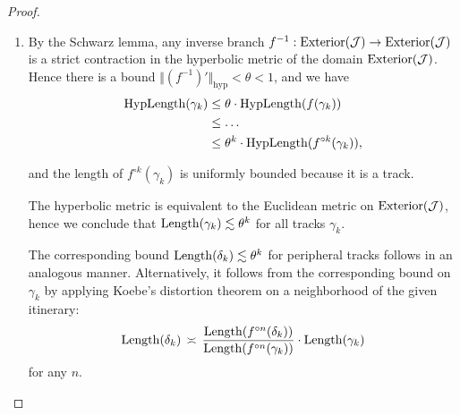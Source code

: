 \begin{proof} \leavevmode
\begin{enumerate}[label=\normalfont(\roman*)]
\item 
By the Schwarz lemma, any inverse branch $f^{-1}: \operatorname{Exterior}(\mathcal J) \to \operatorname{Exterior}(\mathcal J)$ is a strict contraction in the hyperbolic metric of the domain $\operatorname{Exterior}(\mathcal J)$. Hence there is a bound $\Vert (f^{-1})' \Vert _{\mathrm{hyp}}< \theta < 1$, and we have 
\begin{equation}
	\begin{split}
		\operatorname{HypLength}(\gamma_k)  & \leq \theta \cdot \operatorname{HypLength}(f(\gamma_k))\\ & \leq  \dots
		\\ & \leq \theta^k \cdot \operatorname{HypLength}(f^{\circ k}(\gamma_k)),
	\end{split}
\end{equation}

and the length of $f^{\circ k}(\gamma_k)$ is uniformly bounded because it is a track.

The hyperbolic metric is equivalent to the Euclidean metric on  $\operatorname{Exterior}(\mathcal J)$, hence
we conclude that $\operatorname{Length}(\gamma_k) \lesssim \theta^k$ for all tracks $\gamma_k$.

The corresponding bound $\operatorname{Length}(\delta_k) \lesssim \theta^k$ for peripheral tracks follows in an analogous manner. Alternatively, it follows from the corresponding bound on $\gamma_k$ by applying Koebe's distortion theorem on a neighborhood of the given itinerary: 
$$\operatorname{Length}(\delta_k) \, \asymp \, \frac{\operatorname{Length}(f^{\circ n}(\delta_k))}{\operatorname{Length}(f^{\circ n}(\gamma_k))} \cdot \operatorname{Length}(\gamma_k)$$ for any $n$. 






\end{enumerate}
\end{proof}
